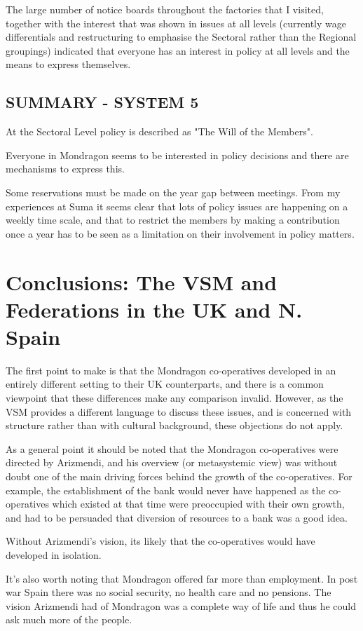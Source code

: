 The large number of notice boards throughout the factories that I visited, together with the interest that was shown in issues at all levels (currently wage differentials and restructuring to emphasise the Sectoral rather than the Regional groupings) indicated that everyone has an interest in policy at all levels and the means to express themselves.

\subsection*{SUMMARY - SYSTEM 5}
At the Sectoral Level policy is described as "The Will of the Members".

Everyone in Mondragon seems to be interested in policy decisions and there are mechanisms to express this.

Some reservations must be made on the year gap between meetings. From my experiences at Suma it seems clear that lots of policy issues are happening on a weekly time scale, and that to restrict the members by making a contribution once a year has to be seen as a limitation on their involvement in policy matters.

\section*{Conclusions: The VSM and Federations in the UK and N. Spain}
The first point to make is that the Mondragon co-operatives developed in an entirely different setting to their UK counterparts, and there is a common viewpoint that these differences make any comparison invalid. However, as the VSM provides a different language to discuss these issues, and is concerned with structure rather than with cultural background, these objections do not apply.

As a general point it should be noted that the Mondragon co-operatives were directed by Arizmendi, and his overview (or metasystemic view) was without doubt one of the main driving forces behind the growth of the co-operatives. For example, the establishment of the bank would never have happened as the co-operatives which existed at that time were preoccupied with their own growth, and had to be persuaded that diversion of resources to a bank was a good idea.

Without Arizmendi's vision, its likely that the co-operatives would have developed in isolation.

It's also worth noting that Mondragon offered far more than employment. In post war Spain there was no social security, no health care and no pensions. The vision Arizmendi had of Mondragon was a complete way of life and thus he could ask much more of the people.

